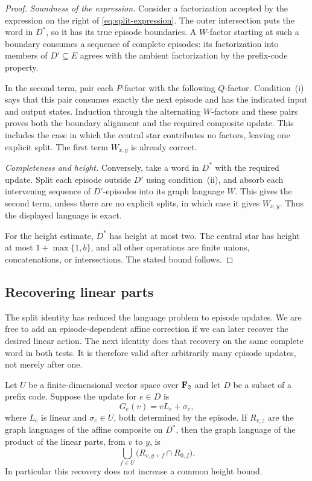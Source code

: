 \begin{proof}
\emph{Soundness of the expression.}
Consider a factorization accepted by the expression on the right of
\eqref{eq:split-expression}. The outer intersection puts the word in
$D^*$, so it has its true episode boundaries. A $W$-factor starting
at such a boundary consumes a sequence of complete episodes:
its factorization into members of $D'\subseteq E$ agrees with the
ambient factorization by the prefix-code property.

In the second term, pair each $P$-factor with the following $Q$-factor.
Condition~\textup{(i)} says that this pair consumes exactly the next
episode and has the indicated input and output states. Induction
through the alternating $W$-factors and these pairs proves both the
boundary alignment and the required composite update. This includes
the case in which the central star contributes no factors, leaving
one explicit split. The first term $W_{x,y}$ is already correct.

\emph{Completeness and height.}
Conversely, take a word in $D^*$ with the required update. Split each
episode outside $D'$ using condition~\textup{(ii)}, and absorb each
intervening sequence of $D'$-episodes into its graph language $W$.
This gives the second term, unless there are no explicit splits, in
which case it gives $W_{x,y}$. Thus the displayed language is exact.

For the height estimate, $D^*$ has height at most two. The central
star has height at most $1+\max\{1,b\}$, and all other operations are
finite unions, concatenations, or intersections. The stated bound
follows.
\end{proof}

\subsection{Recovering linear parts}

The split identity has reduced the language problem to episode updates.
We are free to add an episode-dependent affine correction if we can later
recover the desired linear action. The next identity does that recovery
on the same complete word in both tests. It is therefore valid after
arbitrarily many episode updates, not merely after one.

\begin{lemma}\label{lem:affine-recovery}
Let $U$ be a finite-dimensional vector space over $\mathbf F_2$ and let
$D$ be a subset of a prefix code. Suppose the update for $e\in D$ is
\[
 G_e(v)=vL_e+\sigma_e,
\]
where $L_e$ is linear and $\sigma_e\in U$, both determined by the
episode. If $R_{v,z}$ are the graph languages of the affine composite
on $D^*$, then the graph language of the product of the linear parts,
from $v$ to $y$, is
\[
 \bigcup_{f\in U}\bigl(R_{v,y+f}\cap R_{0,f}\bigr).
\]
In particular this recovery does not increase a common height bound.
\end{lemma}

